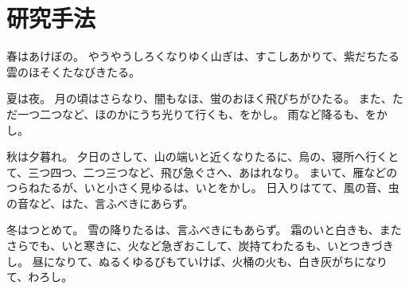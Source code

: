 \chapter{研究手法}\label{chap:numerical}
春はあけぼの。
やうやうしろくなりゆく山ぎは、すこしあかりて、紫だちたる雲のほそくたなびきたる。

夏は夜。
月の頃はさらなり、闇もなほ、蛍のおほく飛びちがひたる。
また、ただ一つ二つなど、ほのかにうち光りて行くも、をかし。
雨など降るも、をかし。

秋は夕暮れ。
夕日のさして、山の端いと近くなりたるに、烏の、寝所へ行くとて、三つ四つ、二つ三つなど、飛び急ぐさへ、あはれなり。
まいて、雁などのつらねたるが、いと小さく見ゆるは、いとをかし。
日入りはてて、風の音、虫の音など、はた、言ふべきにあらず。

冬はつとめて。
雪の降りたるは、言ふべきにもあらず。
霜のいと白きも、またさらでも、いと寒きに、火など急ぎおこして、炭持てわたるも、いとつきづきし。
昼になりて、ぬるくゆるびもていけば、火桶の火も、白き灰がちになりて、わろし。
